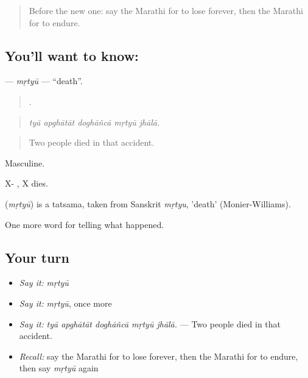 \label{lesson:MR-C309-mrtyu}



\begin{quote}
Before the new one: say the Marathi for to lose forever, then the Marathi for to endure.
\end{quote}

\subsection*{You'll want to know: }
\textbf{} — \emph{mṛtyū} — \textquotedblleft{}death\textquotedblright{}.

\begin{quote}
    .
\end{quote}

\begin{quote}
\emph{tyā apghātāt doghāñcā mṛtyū jhālā.}
\end{quote}

\begin{quote}
Two people died in that accident.
\end{quote}

Masculine.

X-  , X dies.

\begin{cousinweb}
\textbf{} (\emph{mṛtyū}) is a tatsama, taken from Sanskrit \emph{mṛtyu}, 'death' (Monier-Williams).
\end{cousinweb}

\begin{grammarlens}[title={What you've built}]
One more word for telling what happened.
\end{grammarlens}

\subsection*{Your turn}
\begin{itemize}
\raggedright
  \item \emph{Say it:} \emph{mṛtyū}
  \item \emph{Say it:} \emph{mṛtyū}, once more
  \item \emph{Say it:} \emph{tyā apghātāt doghāñcā mṛtyū jhālā.} — Two people died in that accident.
  \item \emph{Recall:} say the Marathi for to lose forever, then the Marathi for to endure, then say \emph{mṛtyū} again
\end{itemize}

